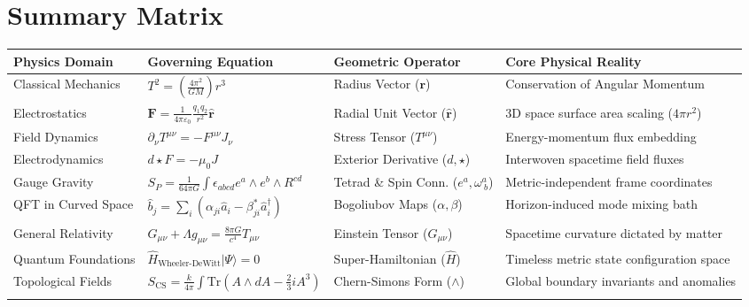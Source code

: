 \documentclass[11pt,a4paper]{article}
\begin{document}
\section*{Summary Matrix}
\begin{table}[H] 
\centering
\def\arraystretch{0.95} %
\fontsize{8.5pt}{10pt}\selectfont %
\begin{tabularx}{\textwidth}{l l l X}
\toprule
\textbf{Physics Domain} & \textbf{Governing Equation} & \textbf{Geometric Operator} & \textbf{Core Physical Reality} \\ \midrule
Classical Mechanics & $T^2 = \left(\frac{4\pi^2}{GM}\right)r^3$ & Radius Vector ($\mathbf{r}$) & Conservation of Angular Momentum \\ \addlinespace[2pt]
Electrostatics & $\mathbf{F} = \frac{1}{4\pi\varepsilon_0}\frac{q_1 q_2}{r^2}\mathbf{\hat{r}}$ & Radial Unit Vector ($\mathbf{\hat{r}}$) & 3D space surface area scaling ($4\pi r^2$) \\ \addlinespace[2pt]
Field Dynamics & $\partial_{\nu} T^{\mu\nu} = -F^{\mu\nu} J_{\nu}$ & Stress Tensor ($T^{\mu\nu}$) & Energy-momentum flux embedding \\ \addlinespace[2pt]
Electrodynamics & $d\star F = -\mu_0 J$ & Exterior Derivative ($d, \star$) & Interwoven spacetime field fluxes \\ \addlinespace[2pt]
Gauge Gravity & $S_P = \frac{1}{64\pi G}\int \epsilon_{abcd}e^a\wedge e^b\wedge R^{cd}$ & Tetrad \& Spin Conn. ($e^a, \omega^a_{\ b}$) & Metric-independent frame coordinates \\ \addlinespace[2pt]
QFT in Curved Space & $\hat{b}_j = \sum_i (\alpha_{ji}\hat{a}_i - \beta_{ji}^*\hat{a}_i^{\dagger})$ & Bogoliubov Maps ($\alpha, \beta$) & Horizon-induced mode mixing bath \\ \addlinespace[2pt]
General Relativity & $G_{\mu\nu} + \Lambda g_{\mu\nu} = \frac{8\pi G}{c^4} T_{\mu\nu}$ & Einstein Tensor ($G_{\mu\nu}$) & Spacetime curvature dictated by matter \\ \addlinespace[2pt]
Quantum Foundations & $\hat{H}_{\text{Wheeler-DeWitt}}|\Psi\rangle = 0$ & Super-Hamiltonian ($\hat{H}$) & Timeless metric state configuration space \\ \addlinespace[2pt]
Topological Fields & $S_{\text{CS}} = \frac{k}{4\pi} \int \text{Tr}(A \wedge dA - \frac{2}{3}i A^3)$ & Chern-Simons Form ($\wedge$) & Global boundary invariants and anomalies \\ \addlinespace[2pt]

\end{tabularx}
\end{table}
\end{document}
